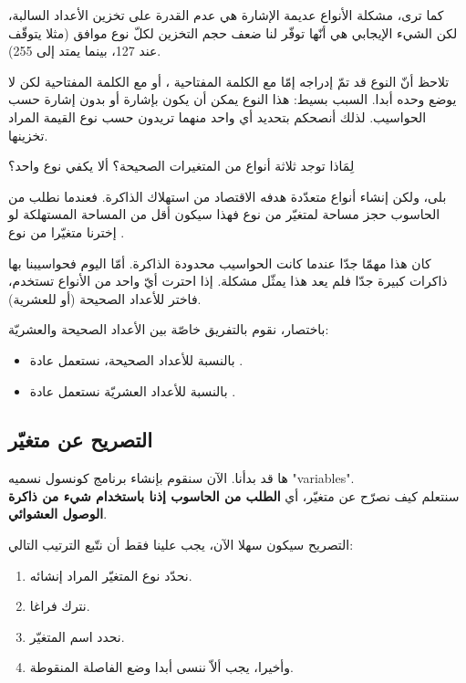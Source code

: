 كما ترى، مشكلة الأنواع عديمة الإشارة هي عدم القدرة على تخزين الأعداد السالبة، لكن الشيء الإيجابي هي أنّها توفّر لنا ضعف حجم التخزين لكلّ نوع موافق (مثلا
يتوقّف عند 127، بينما
يمتد إلى 255).

\begin{information}
  تلاحظ أنّ النوع
قد تمّ إدراجه إمّا مع الكلمة المفتاحية
،
أو مع الكلمة المفتاحية
لكن لا يوضع وحده أبدا. السبب بسيط: هذا النوع يمكن أن يكون بإشارة أو بدون إشارة حسب الحواسيب. لذلك أنصحكم بتحديد أي واحد منهما تريدون حسب نوع القيمة المراد تخزينها.
\end{information}

\begin{question}
  لِمَاذا توجد ثلاثة أنواع من المتغيرات الصحيحة؟ ألا يكفي نوع واحد؟
\end{question}

بلى، ولكن إنشاء أنواع متعدّدة هدفه الاقتصاد من استهلاك الذاكرة. فعندما نطلب من الحاسوب حجز مساحة لمتغيّر من نوع
فهذا سيكون أقل من المساحة المستهلكة لو إخترنا متغيّرا من نوع
.

كان هذا مهمّا جدّا عندما كانت الحواسيب محدودة الذاكرة. أمّا اليوم فحواسيبنا بها ذاكرات كبيرة جدّا فلم يعد هذا يمثّل مشكلة. إذا احترت أيّ واحد من الأنواع تستخدم، فاختر
للأعداد الصحيحة (أو
للعشرية).

باختصار، نقوم بالتفريق خاصّة بين الأعداد الصحيحة والعشريّة:
\begin{itemize}
  \item بالنسبة للأعداد الصحيحة، نستعمل عادة
.
  \item بالنسبة للأعداد العشريّة نستعمل عادة
.
\end{itemize}

\subsection{التصريح عن متغيّر}
ها قد بدأنا. الآن سنقوم بإنشاء برنامج كونسول نسميه "\textenglish{variables}".\\
 سنتعلم كيف نصرّح عن متغيّر، أي
 \textbf{الطلب من الحاسوب إذنا باستخدام شيء من ذاكرة الوصول العشوائي}.

 التصريح سيكون سهلا الآن، يجب علينا فقط أن نتّبع الترتيب التالي:
 
 \begin{enumerate}
   \item نحدّد نوع المتغيّر المراد إنشائه.
   \item نترك فراغا.
   \item نحدد اسم المتغيّر.
   \item وأخيرا، يجب ألاّ ننسى أبدا وضع الفاصلة المنقوطة.
 \end{enumerate}

